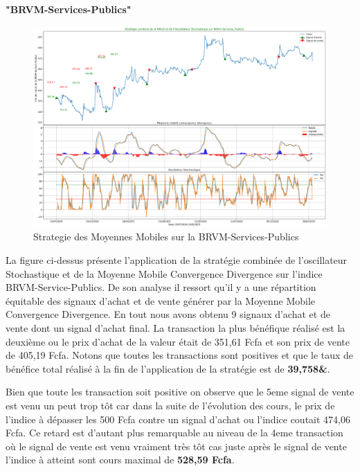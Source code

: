 \begin{itemize}
  \textbf{"BRVM-Services-Publics"}

  \begin{figure}
  \hypertarget{fig:Strategieux20desux20Moyennesux20Mobilesux20surux20laux20BRVM-Services-Publics}{%
  \centering
  \includegraphics{img/MACD-Public.png}
  \caption{Strategie des Moyennes Mobiles sur la
  BRVM-Services-Publics}\label{fig:Strategieux20desux20Moyennesux20Mobilesux20surux20laux20BRVM-Services-Publics}
  }
  \end{figure}

  La figure ci-dessus présente l'application de la stratégie combinée de
  l'oscillateur Stochastique et de la Moyenne Mobile Convergence
  Divergence sur l'indice BRVM-Service-Publics. De son analyse il
  ressort qu'il y a une répartition équitable des signaux d'achat et de
  vente générer par la Moyenne Mobile Convergence Divergence. En tout
  nous avons obtenu 9 signaux d'achat et de vente dont un signal d'achat
  final. La transaction la plus bénéfique réalisé est la deuxième ou le
  prix d'achat de la valeur était de 351,61 Fcfa et son prix de vente de
  405,19 Fcfa. Notons que toutes les transactions sont positives et que
  le taux de bénéfice total réalisé à la fin de l'application de la
  stratégie est de \textbf{39,758\&}.

  Bien que toute les transaction soit positive on observe que le 5eme
  signal de vente est venu un peut trop tôt car dans la suite de
  l'évolution des cours, le prix de l'indice à dépasser les 500 Fcfa
  contre un signal d'achat ou l'indice coutait 474,06 Fcfa. Ce retard
  est d'autant plus remarquable au niveau de la 4eme transaction où le
  signal de vente est venu vraiment très tôt cas juste après le signal
  de vente l'indice à atteint sont cours maximal de \textbf{528,59
  Fcfa}.


\end{itemize}
